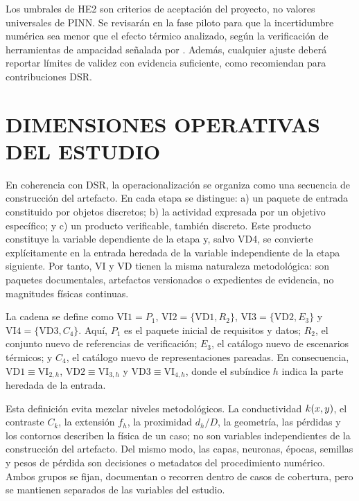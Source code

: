 Los umbrales de HE2 son criterios de aceptación del proyecto, no valores universales de PINN. Se revisarán en la fase piloto para que la incertidumbre numérica sea menor que el efecto térmico analizado, según la verificación de herramientas de ampacidad señalada por \textcite[93--99]{cigre2025}. Además, cualquier ajuste deberá reportar límites de validez con evidencia suficiente, como recomiendan \textcite[350--351]{gregor2013} para contribuciones DSR.

\section{DIMENSIONES OPERATIVAS DEL ESTUDIO}
\label{sec:dimensiones-operativas}

En coherencia con DSR, la operacionalización se organiza como una secuencia de construcción del artefacto. En cada etapa se distingue: a) un paquete de entrada constituido por objetos discretos; b) la actividad expresada por un objetivo específico; y c) un producto verificable, también discreto. Este producto constituye la variable dependiente de la etapa y, salvo VD4, se convierte explícitamente en la entrada heredada de la variable independiente de la etapa siguiente. Por tanto, VI y VD tienen la misma naturaleza metodológica: son paquetes documentales, artefactos versionados o expedientes de evidencia, no magnitudes físicas continuas.

La cadena se define como $\mathrm{VI1}=P_1$, $\mathrm{VI2}=\{\mathrm{VD1},R_2\}$, $\mathrm{VI3}=\{\mathrm{VD2},E_3\}$ y $\mathrm{VI4}=\{\mathrm{VD3},C_4\}$. Aquí, $P_1$ es el paquete inicial de requisitos y datos; $R_2$, el conjunto nuevo de referencias de verificación; $E_3$, el catálogo nuevo de escenarios térmicos; y $C_4$, el catálogo nuevo de representaciones pareadas. En consecuencia, $\mathrm{VD1}\equiv\mathrm{VI}_{2,h}$, $\mathrm{VD2}\equiv\mathrm{VI}_{3,h}$ y $\mathrm{VD3}\equiv\mathrm{VI}_{4,h}$, donde el subíndice $h$ indica la parte heredada de la entrada.

Esta definición evita mezclar niveles metodológicos. La conductividad $k(x,y)$, el contraste $C_k$, la extensión $f_h$, la proximidad $d_h/D$, la geometría, las pérdidas y los contornos describen la física de un caso; no son variables independientes de la construcción del artefacto. Del mismo modo, las capas, neuronas, épocas, semillas y pesos de pérdida son decisiones o metadatos del procedimiento numérico. Ambos grupos se fijan, documentan o recorren dentro de casos de cobertura, pero se mantienen separados de las variables del estudio.


